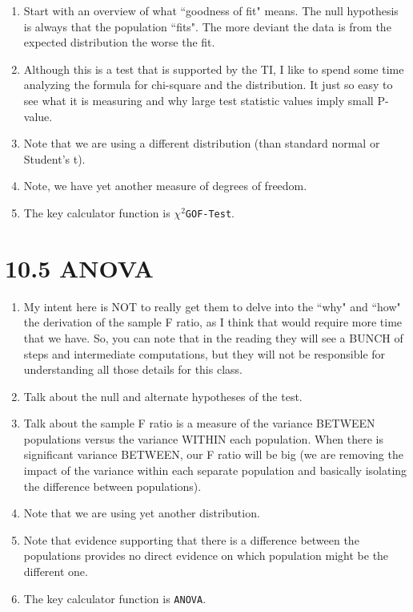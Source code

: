 \documentclass{article}
\begin{document}
\begin{enumerate}

  \item Start with an overview of what ``goodness of fit" means. The null hypothesis is always that the population ``fits". The more deviant the data is from the expected distribution the worse the fit.
  
  \item Although this is a test that is supported by the TI, I like to spend some time analyzing the formula for chi-square and the distribution. It just so easy to see what it is measuring and why large test statistic values imply small P-value.
  
  \item Note that we are using a different distribution (than standard normal or Student’s t).
  
  \item Note, we have yet another measure of degrees of freedom.
  
  \item The key calculator function is $\chi^2$\texttt{GOF-Test}.
  
\end{enumerate}

\section*{10.5 ANOVA}

\begin{enumerate}

    \item My intent here is NOT to really get them to delve into the ``why" and ``how" the derivation of the sample F ratio, as I think that would require more time that we have. So, you can note that in the reading they will see a BUNCH of steps and intermediate computations, but they will not be responsible for understanding all those details for this class.
    
    \item Talk about the null and alternate hypotheses of the test.
    
    \item Talk about the sample F ratio is a measure of the variance BETWEEN populations versus the variance WITHIN each population. When there is significant variance BETWEEN, our F ratio will be big (we are removing the impact of the variance within each separate population and basically isolating the difference between populations).
    
    \item Note that we are using yet another distribution.
    
    \item Note that evidence supporting that there is a difference between the populations provides no direct evidence on which population might be the different one.
    
    \item The key calculator function is \texttt{ANOVA}.
    
\end{enumerate}
\end{document}
